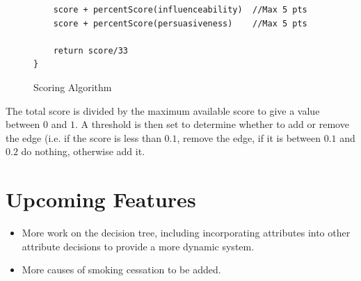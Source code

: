 \documentclass[]{article}
\begin{document}
\begin{enumerate}
\begin{figure}
\begin{center}
\begin{lstlisting}
	score + percentScore(influenceability)	//Max 5 pts
	score + percentScore(persuasiveness)	//Max 5 pts

	return score/33
}
	\end{lstlisting}
\end{center}
\label{pseudo}
\caption{Scoring Algorithm}
\end{figure}
The total score is divided by the maximum available score to give a value between $0$ and $1$. A threshold is then set to determine whether to add or remove the edge (i.e. if the score is less than $0.1$, remove the edge, if it is between $0.1$ and $0.2$ do nothing, otherwise add it.

\end{enumerate}

\section{Upcoming Features}
\begin{itemize}
\item More work on the decision tree, including incorporating attributes into other attribute decisions to provide a more dynamic system.
\item More causes of smoking cessation to be added.
\end{itemize}
\end{document}
